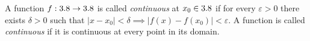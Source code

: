 \begin{definition}
A function $f : 3.8 \to 3.8$ is called \emph{continuous} at $x_0 \in 3.8$ if for every $\varepsilon > 0$ there exists $\delta > 0$ such that
\(
|x-x_0| < \delta \implies |f(x)-f(x_0)| < \varepsilon
\).
A function is called \emph{continuous} if it is continuous at every point in its domain.

\end{definition}

